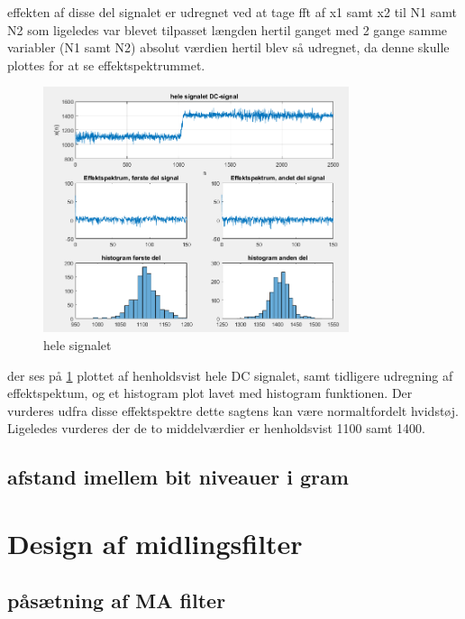 \documentclass{article}
\begin{document}
effekten af disse del signalet er udregnet ved at tage fft af x1 samt x2 til N1 samt N2 som ligeledes var blevet tilpasset længden hertil ganget med 2 gange samme variabler (N1 samt N2)
absolut værdien hertil blev så udregnet, da denne skulle plottes for at se effektspektrummet.

\begin{figure}[h!]
  \centering
  \includegraphics[width=0.8\textwidth]{rod/startsignal.png}
  \caption{hele signalet}
  \label{fig:helesignal}
\end{figure}

der ses på \ref{fig:helesignal} plottet af henholdsvist hele DC signalet, samt tidligere udregning af effektspektum, og et histogram plot lavet med histogram funktionen.
Der vurderes udfra disse effektspektre dette sagtens kan være normaltfordelt hvidstøj.
Ligeledes vurderes der de to middelværdier er henholdsvist 1100 samt 1400.

\subsection{afstand imellem bit niveauer i gram}
\label{sec:afstand}

\section{Design af midlingsfilter}
\label{sec:Design}

\subsection{påsætning af MA filter}
\label{sec:påsæt}
\end{document}

